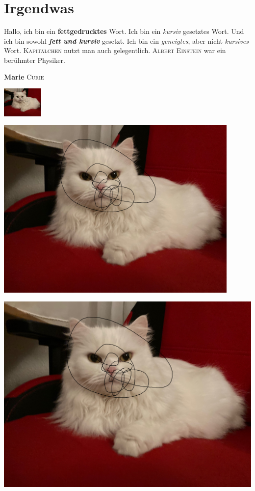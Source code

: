 \documentclass[12pt,ngerman,parskip=half]{scrreprt}
\newcommand{\physiker}[1]{\textcolor{FUH}{\textsc{#1}}}
\newcommand{\Physiker}[2]{\textcolor{fuh}{\textbf{#1} \textsc{#2}}}
\begin{document}
\blindtext[1] 

\chapter{Irgendwas}

Hallo, ich bin ein \textbf{fettgedrucktes} Wort. Ich bin ein \textit{kursiv} gesetztes Wort. Und ich bin sowohl \textbf{\textit{fett und kursiv}} gesetzt. Ich bin ein \textsl{geneigtes}, aber nicht \textit{kursives} Wort. \textsc{Kapitälchen} nutzt man auch gelegentlich. \physiker{Albert Einstein} war ein berühmter Physiker.

\Physiker{Marie}{Curie}

\includegraphics[width=2cm]{./Bilder/Katze} %

\begin{center}
\includegraphics[width=0.9\textwidth]{./Bilder/Katze} %
\end{center}


\begin{center}
\includegraphics[height=0.25\textheight,angle=45]{./Bilder/Katze} %
\end{center}
\end{document}
